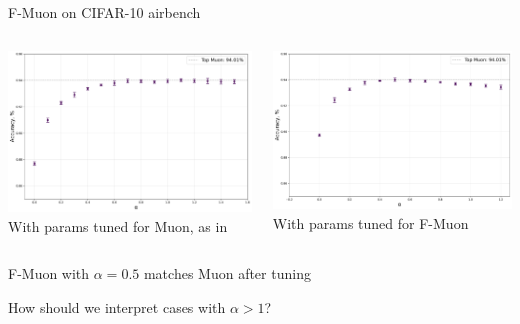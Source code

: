 \documentclass[aspectratio=169]{beamer}
\begin{document}
\begin{frame}{F-Muon on CIFAR-10 airbench}
    \begin{columns}[T,totalwidth=\textwidth]
      \begin{column}{0.48\textwidth}
        \includegraphics[width=\linewidth]{muon_tuned_diff_alpha.pdf}
        \centering
        \scriptsize With params tuned for Muon, as in \citep{cifar2023airbench}
      \end{column}
      \begin{column}{0.48\textwidth}
        \includegraphics[width=\linewidth]{fmuon_tuned_diff_alpha.pdf}
        \centering
        \scriptsize With params tuned for F-Muon
      \end{column}
    \end{columns}
    \vspace{0.6em}
    \centering

    \footnotesize F-Muon with \(\alpha = 0.5\) matches Muon after tuning

    \faQuestionCircle \space How should we interpret cases with $\alpha > 1$?
  \end{frame}
\end{document}
